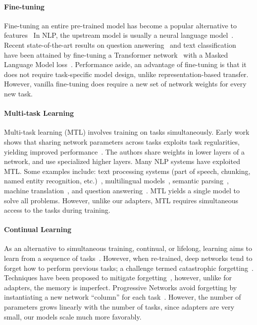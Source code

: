 \documentclass{article}
\begin{document}
\paragraph{Fine-tuning}
Fine-tuning an entire pre-trained model has become a popular alternative to features~\citep{dai2015,howard2018universal,radford2018improving}
In NLP, the upstream model is usually a neural language model~\citep{bengio2003}.
Recent state-of-the-art results on question answering~\citep{rajpurkar2016} and text classification~\citep{wang2018glue} have been attained by fine-tuning a Transformer network~\citep{vaswani2017} with a Masked Language Model loss~\citep{devlin2018bert}.
Performance aside, an advantage of fine-tuning is that it does not require task-specific model design, unlike representation-based transfer.
However, vanilla fine-tuning does require a new set of network weights for every new task.

\paragraph{Multi-task Learning}
Multi-task learning (MTL) involves training on tasks simultaneously.
Early work shows that sharing network parameters across tasks exploits task regularities, yielding improved performance~\citep{caruana1997}.
The authors share weights in lower layers of a network, and use specialized higher layers.
Many NLP systems have exploited MTL.
Some examples include: text processing systems (part of speech, chunking, named entity recognition, etc.)~\citep{collobert2008}, multilingual models~\citep{huang2013cross}, semantic parsing~\citep{peng2017}, machine translation~\citep{johnson2017}, and question answering~\citep{choi2017}.
MTL yields a single model to solve all problems.
However, unlike our adapters, MTL requires simultaneous access to the tasks during training.

\paragraph{Continual Learning}
As an alternative to simultaneous training, continual, or lifelong, learning aims to learn from a sequence of tasks~\citep{thrun1998}.
However, when re-trained, deep networks tend to forget how to perform previous tasks; a challenge termed catastrophic forgetting~\citep{mccloskey1989catastrophic,french1999catastrophic}.
Techniques have been proposed to mitigate forgetting~\citep{kirkpatrick2017overcoming,zenke2017continual}, however, unlike for adapters, the memory is imperfect.
Progressive Networks avoid forgetting by instantiating a new network ``column'' for each task~\citep{rusu2016progressive}.
However, the number of parameters grows linearly with the number of tasks,
since adapters are very small, our models scale much more favorably.
\end{document}
